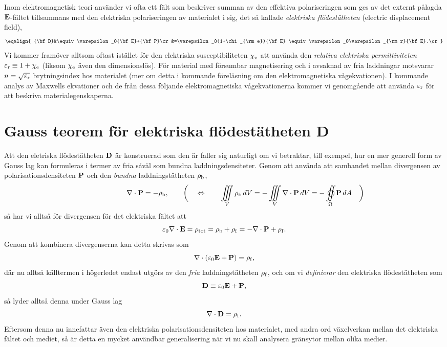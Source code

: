 {Inom elektromagnetisk teori anv{\"a}nder vi ofta ett f{\"a}lt som beskriver
summan av den effektiva polariseringen som ges av det externt p{\aa}lagda
${\bf E}$-f{\"a}ltet tillsammans med den elektriska polariseringen av
materialet i sig, det s{\aa} kallade {\it elektriska fl{\"o}dest{\"a}theten}
(electric displacement field),
$$
  \eqalign{
    {\bf D}&\equiv\varepsilon_0{\bf E}+{\bf P}\cr
      &=\varepsilon_0(1+\chi_{\rm e}){\bf E}
       \equiv\varepsilon_0\varepsilon_{\rm r}{\bf E}.\cr
  }
$$
Vi kommer fram{\"o}ver alltsom oftast ist{\"a}llet f{\"o}r den elektriska
susceptibiliteten $\chi_{\rm e}$ att anv{\"a}nda den {\it relativa elektriska
permittiviteten} $\varepsilon_{\rm r}\equiv 1+\chi_{\rm e}$ (liksom
$\chi_{\rm e}$ {\"a}ven den dimensionsl{\"o}s). F{\"o}r material med
f{\"o}rsumbar magnetisering och i avsaknad av fria laddningar motsvarar
$n=\sqrt{\varepsilon_{\rm r}}$ brytningsindex hos materialet (mer om detta
i kommande f{\"o}rel{\"a}sning om den elektromagnetiska v{\aa}gekvationen).
I kommande analys av Maxwells ekvationer och de fr{\aa}n dessa f{\"o}ljande
elektromagnetiska v{\aa}gekvationerna kommer vi genomg{\aa}ende att anv{\"a}nda
$\varepsilon_{\rm r}$ f{\"o}r att beskriva materialegenskaperna.

\section{Gauss teorem f{\"o}r elektriska fl{\"o}dest{\"a}theten {\bf D}}
Att den eletriska fl{\"o}dest{\"a}theten ${\bf D}$ {\"a}r konstruerad som den
{\"a}r faller sig naturligt om vi betraktar, till exempel, hur en mer generell
form av Gauss lag kan formuleras i termer av fria s{\aa}v{\"a}l som bundna
laddningsdensiteter.
Genom att anv{\"a}nda att sambandet mellan divergensen av
polarisationsdensiteten ${\bf P}$ och den {\it bundna} laddningst{\"a}theten
$\rho_{\rm b}$,
$$
  \qquad
  \qquad
  \qquad
  \nabla\cdot{\bf P} = -\rho_{\rm b},
  \qquad
  \bigg(\quad\Leftrightarrow\qquad
  \iiint_V \rho_{\rm b}\,dV
    = -\iiint_V\nabla\cdot{\bf P}\,dV
    = -\oiint_{\Omega}{\bf P}\,dA
    \quad\bigg)
$$
s{\aa} har vi allts{\aa} f{\"o}r divergensen f{\"o}r det elektriska f{\"a}ltet
att
$$
  \varepsilon_0\nabla\cdot{\bf E}
    =\rho_{\rm tot}
    =\rho_{\rm b}+\rho_{\rm f}
    =-\nabla\cdot{\bf P}+\rho_{\rm f}.
$$
Genom att kombinera divergenserna kan detta skrivas som
$$
  \nabla\cdot(\varepsilon_0{\bf E}+{\bf P})=\rho_{\rm f},
$$
d{\"a}r nu allts{\aa} k{\"a}lltermen i h{\"o}gerledet endast utg{\"o}rs av den
{\it fria} laddningst{\"a}theten $\rho_{\rm f}$, och om vi {\it definierar} den
elektriska fl{\"o}dest{\"a}theten som
$$
  {\bf D}\equiv\varepsilon_0{\bf E}+{\bf P},
$$
s{\aa} lyder allts{\aa} denna under Gauss lag
$$
  \nabla\cdot{\bf D}=\rho_{\rm f}.
$$
Eftersom denna nu innefattar {\"a}ven den elektriska polarisationsdensiteten
hos materialet, med andra ord v{\"a}xelverkan mellan det elektriska f{\"a}ltet
och mediet, s{\aa} {\"a}r detta en mycket anv{\"a}ndbar generalisering n{\"a}r
vi nu skall analysera gr{\"a}nsytor mellan olika medier.
\vfill\eject

}
